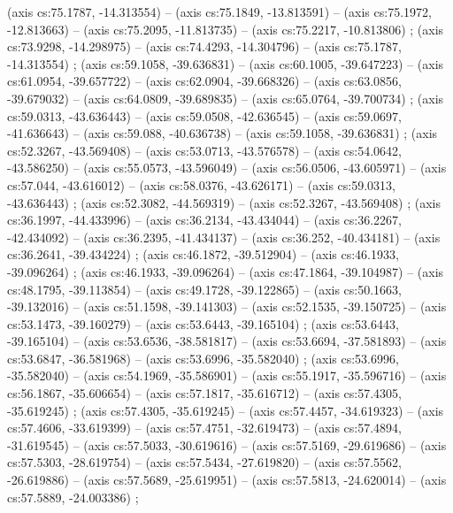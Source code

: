     (axis cs:75.1787,    -14.313554) --  (axis cs:75.1849,    -13.813591) --  (axis cs:75.1972,    -12.813663) --  (axis cs:75.2095,    -11.813735) --  (axis cs:75.2217,    -10.813806) ;
    (axis cs:73.9298,    -14.298975) --  (axis cs:74.4293,    -14.304796) --  (axis cs:75.1787,    -14.313554) ;
    (axis cs:59.1058,    -39.636831) --  (axis cs:60.1005,    -39.647223) --  (axis cs:61.0954,    -39.657722) --  (axis cs:62.0904,    -39.668326) --  (axis cs:63.0856,    -39.679032) --  (axis cs:64.0809,    -39.689835) --  (axis cs:65.0764,    -39.700734) ;
    (axis cs:59.0313,    -43.636443) --  (axis cs:59.0508,    -42.636545) --  (axis cs:59.0697,    -41.636643) --  (axis cs:59.088,    -40.636738) --  (axis cs:59.1058,    -39.636831) ;
    (axis cs:52.3267,    -43.569408) --  (axis cs:53.0713,    -43.576578) --  (axis cs:54.0642,    -43.586250) --  (axis cs:55.0573,    -43.596049) --  (axis cs:56.0506,    -43.605971) --  (axis cs:57.044,    -43.616012) --  (axis cs:58.0376,    -43.626171) --  (axis cs:59.0313,    -43.636443) ;
    (axis cs:52.3082,    -44.569319) --  (axis cs:52.3267,    -43.569408) ;
    (axis cs:36.1997,    -44.433996) --  (axis cs:36.2134,    -43.434044) --  (axis cs:36.2267,    -42.434092) --  (axis cs:36.2395,    -41.434137) --  (axis cs:36.252,    -40.434181) --  (axis cs:36.2641,    -39.434224) ;
    (axis cs:46.1872,    -39.512904) --  (axis cs:46.1933,    -39.096264) ;
    (axis cs:46.1933,    -39.096264) --  (axis cs:47.1864,    -39.104987) --  (axis cs:48.1795,    -39.113854) --  (axis cs:49.1728,    -39.122865) --  (axis cs:50.1663,    -39.132016) --  (axis cs:51.1598,    -39.141303) --  (axis cs:52.1535,    -39.150725) --  (axis cs:53.1473,    -39.160279) --  (axis cs:53.6443,    -39.165104) ;
    (axis cs:53.6443,    -39.165104) --  (axis cs:53.6536,    -38.581817) --  (axis cs:53.6694,    -37.581893) --  (axis cs:53.6847,    -36.581968) --  (axis cs:53.6996,    -35.582040) ;
    (axis cs:53.6996,    -35.582040) --  (axis cs:54.1969,    -35.586901) --  (axis cs:55.1917,    -35.596716) --  (axis cs:56.1867,    -35.606654) --  (axis cs:57.1817,    -35.616712) --  (axis cs:57.4305,    -35.619245) ;
    (axis cs:57.4305,    -35.619245) --  (axis cs:57.4457,    -34.619323) --  (axis cs:57.4606,    -33.619399) --  (axis cs:57.4751,    -32.619473) --  (axis cs:57.4894,    -31.619545) --  (axis cs:57.5033,    -30.619616) --  (axis cs:57.5169,    -29.619686) --  (axis cs:57.5303,    -28.619754) --  (axis cs:57.5434,    -27.619820) --  (axis cs:57.5562,    -26.619886) --  (axis cs:57.5689,    -25.619951) --  (axis cs:57.5813,    -24.620014) --  (axis cs:57.5889,    -24.003386) ;

